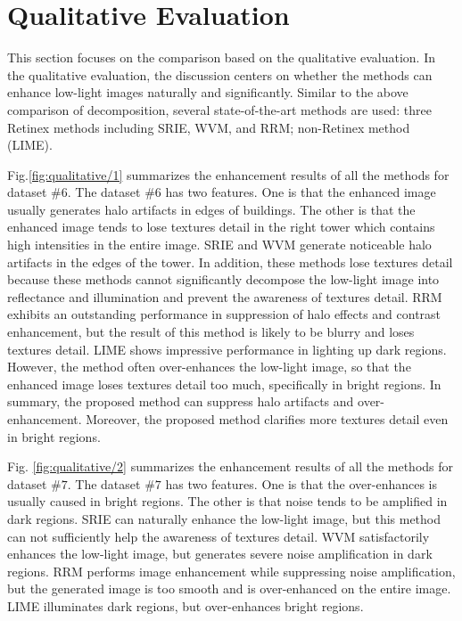 \section{Qualitative Evaluation} \label{sec:qualitative}
This section focuses on the comparison based on the qualitative evaluation. 
In the qualitative evaluation, the discussion centers on whether the methods can enhance low-light images naturally and significantly. Similar to the above comparison of decomposition, several state-of-the-art methods are used: three Retinex methods including SRIE, WVM, and RRM; non-Retinex method (LIME). \par
Fig.\ref{fig:qualitative/1} summarizes the enhancement results of all the methods for dataset $\#6$.
The dataset $\#6$ has two features. One is  that the enhanced image usually generates halo artifacts in edges of buildings. The other is that the enhanced image tends to lose textures detail in the right tower which contains high intensities in the entire image. SRIE and WVM generate noticeable halo artifacts in the edges of the tower. In addition, these methods lose textures detail because these methods cannot significantly decompose the low-light image into reflectance and illumination and prevent the awareness of textures detail. 
RRM exhibits an outstanding performance in suppression of halo effects and contrast enhancement, but the result of this method is likely to be blurry and loses textures detail.
LIME shows impressive performance in lighting up dark regions. However, the method often over-enhances the low-light image, so that the enhanced image loses textures detail too much, specifically in bright regions. 
In summary, the proposed method can suppress halo artifacts and over-enhancement. Moreover, the proposed method clarifies more textures detail even in bright regions.\par
Fig. \ref{fig:qualitative/2} summarizes the enhancement results of all the methods for dataset $\#7$. The dataset $\#7$ has two features. One is that the over-enhances is usually caused in bright regions. The other is that noise tends to be amplified in dark regions. SRIE can naturally enhance the low-light image, but this method can not sufficiently help the awareness of textures detail. WVM satisfactorily enhances the low-light image, but generates severe noise amplification in dark regions. RRM performs image enhancement while suppressing noise amplification, but the generated image is too smooth and is over-enhanced on the entire image. LIME illuminates dark regions, but over-enhances bright regions.
